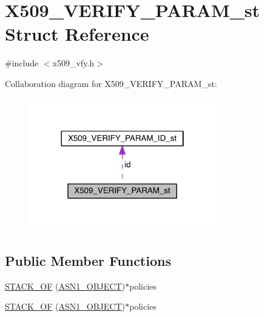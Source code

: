 \hypertarget{struct_x509___v_e_r_i_f_y___p_a_r_a_m__st}{}\section{X509\+\_\+\+V\+E\+R\+I\+F\+Y\+\_\+\+P\+A\+R\+A\+M\+\_\+st Struct Reference}
\label{struct_x509___v_e_r_i_f_y___p_a_r_a_m__st}


{\ttfamily \#include $<$x509\+\_\+vfy.\+h$>$}



Collaboration diagram for X509\+\_\+\+V\+E\+R\+I\+F\+Y\+\_\+\+P\+A\+R\+A\+M\+\_\+st\+:\nopagebreak
\begin{figure}[H]
\begin{center}
\leavevmode
\includegraphics[width=230pt]{struct_x509___v_e_r_i_f_y___p_a_r_a_m__st__coll__graph}
\end{center}
\end{figure}
\subsection*{Public Member Functions}
\begin{DoxyCompactItemize}
\item 
\hyperlink{struct_x509___v_e_r_i_f_y___p_a_r_a_m__st_a9320445919638a3fcc8652356d90dcf7}{S\+T\+A\+C\+K\+\_\+\+OF} (\hyperlink{crypto_2ossl__typ_8h_ae3fda0801e4c8e250087052bafb3ce2e}{A\+S\+N1\+\_\+\+O\+B\+J\+E\+CT})$\ast$policies
\item 
\hyperlink{struct_x509___v_e_r_i_f_y___p_a_r_a_m__st_a9320445919638a3fcc8652356d90dcf7}{S\+T\+A\+C\+K\+\_\+\+OF} (\hyperlink{crypto_2ossl__typ_8h_ae3fda0801e4c8e250087052bafb3ce2e}{A\+S\+N1\+\_\+\+O\+B\+J\+E\+CT})$\ast$policies
\end{DoxyCompactItemize}
